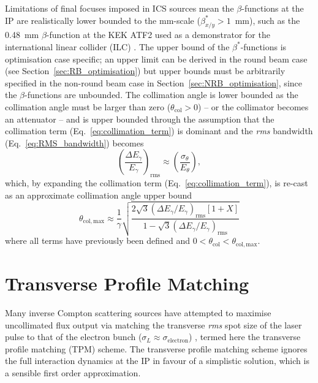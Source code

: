 \documentclass[../main.tex]{subfiles}
\begin{document}
Limitations of final focuses imposed in ICS sources mean the $\beta$-functions at the IP are realistically lower bounded to the \si{\milli\meter}-scale ($\beta_{x/y}^{*} > 1$~\si{\milli\meter}), such as the 0.48~\si{\milli\meter} $\beta$-function at the KEK ATF2 \cite{okugi2016achievemen} used as a demonstrator for the international linear collider (ILC) \cite{yamamoto2021international}. The upper bound of the $\beta^{*}$-functions is optimisation case specific; an upper limit can be derived in the round beam case (see Section~\ref{sec:RB_optimisation}) but upper bounds must be arbitrarily specified in the non-round beam case in Section~\ref{sec:NRB_optimisation}, since the $\beta$-functions are unbounded. The collimation angle is lower bounded as the collimation angle must be larger than zero ($\theta_{\mathrm{col}}>0$) -- or the collimator becomes an attenuator -- and is upper bounded through the assumption that the collimation term (Eq.~\ref{eq:collimation_term}) is dominant and the \textit{rms} bandwidth (Eq.~\ref{eq:RMS_bandwidth}) becomes
\begin{equation}
\left(\frac{\Delta E_{\gamma}}{E_{\gamma}}\right)_{\mathrm{rms}} \approx \left(\frac{\sigma_{\theta}}{E_{\theta}}\right),    
\label{eq:collimation_dominant}
\end{equation}
which, by expanding the collimation term (Eq.~\ref{eq:collimation_term}), is re-cast as an approximate collimation angle upper bound  
\begin{equation}
\theta_{\mathrm{col},\mathrm{max}} \approx \frac{1}{\gamma}\sqrt{\frac{2\sqrt{3}\left(\Delta E_{\gamma}/E_{\gamma}\right)_{\mathrm{rms}}\left[1+X\right]}{1-\sqrt{3}\left(\Delta E_{\gamma}/E_{\gamma}\right)_{\mathrm{rms}}}}
\label{eq:collimation_angle_upper_bound}    
\end{equation}
where all terms have previously been defined and $0<\theta_{\mathrm{col}}<\theta_{\mathrm{col},\mathrm{max}}$.

\section{Transverse Profile Matching}
\label{sec:transverse_profile_matching}

Many inverse Compton scattering sources have attempted to maximise uncollimated flux output via matching the transverse \textit{rms} spot size of the laser pulse to that of the electron bunch ($\sigma_{L}\approx\sigma_{\mathrm{electron}}$) \cite{akagi2016narrow,deitrick2018high,jacquet2015radiation,drebot2019brixs}, termed here the transverse profile matching (TPM) scheme. The transverse profile matching scheme ignores the full interaction dynamics at the IP in favour of a simplistic solution, which is a sensible first order approximation. 
\end{document}
